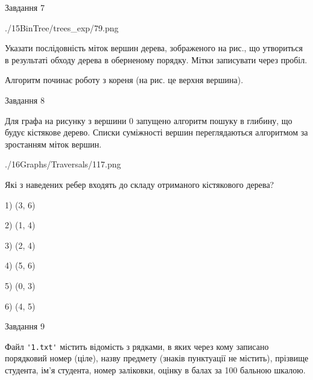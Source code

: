 \documentclass[12pt, ukrainian]{article}
\def\code#1{\Verb!#1!}
\begin{document}
{\vspace{10mm}\par

\newpage
\begin{minipage}[t]{9.7cm}
               
{\begin{center}Завдання {7}\end{center}}
\vspace{-6mm}

\begin{center}
	{./15BinTree/trees_exp/79.png}
\end{center}
Указати послідовність міток вершин дерева, зображеного на рис., що утвориться в результаті обходу дерева в оберненому порядку. Мітки записувати через пробіл.\par Алгоритм починає роботу з кореня (на рис. це верхня вершина).\par

\end{minipage}
\vline \hspace{8mm}
\begin{minipage}[t]{8.0cm}
               
{\begin{center}Завдання {8}\end{center}}
\vspace{-6mm}
Для графа на рисунку з вершини 0 запущено алгоритм пошуку в глибину, що будує кістякове дерево. Списки суміжності вершин переглядаються алгоритмом за зростанням міток вершин.\par
\begin{center}
	{./16Graphs/Traversals/117.png}
\end{center}
\par Які з наведених ребер входять до складу отриманого кістякового дерева?\par
1) (3, 6)\par
2) (1, 4)\par
3) (2, 4)\par
4) (5, 6)\par
5) (0, 3)\par
6) (4, 5)\par
{\vskip 15pt} \par

\end{minipage}

               
{\begin{center}Завдання {9}\end{center}}
\vspace{-6mm}
Файл \code{'1.txt'} містить відомість з рядками, в яких через кому записано поряд\-ковий номер (ціле), назву предмету (знаків пунктуації не містить), прізвище студента, ім'я студента, номер заліковки, оцінку в балах за 100 бальною шкалою.

}
\end{document}
